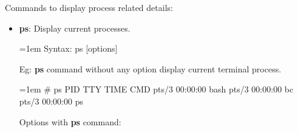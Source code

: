 \setlength{\columnsep}{3pt}
\begin{flushleft}
	Commands to display process related details:
	\begin{itemize}
		\item \textbf{ps}: Display current processes.
		\bigskip
		\begin{tcolorbox}[breakable,notitle,boxrule=-0pt,colback=pink,colframe=pink]
			\color{black}
			\font=1em
			Syntax: ps [options]
			\font=4pt
		\end{tcolorbox}
		Eg: \textbf{ps} command without any option display current terminal process.
		\begin{tcolorbox}[breakable,notitle,boxrule=-0pt,colback=black,colframe=black]
			\color{green}
			\font=1em
			\#  ps
			\color{white}
			\newline
			    PID TTY          TIME CMD
			 pts/3    00:00:00 bash
			 pts/3    00:00:00 bc
			 pts/3    00:00:00 ps
			\font=4pt
		\end{tcolorbox}
		
		Options with \textbf{ps} command:	
		

\end{itemize}
\end{flushleft}
